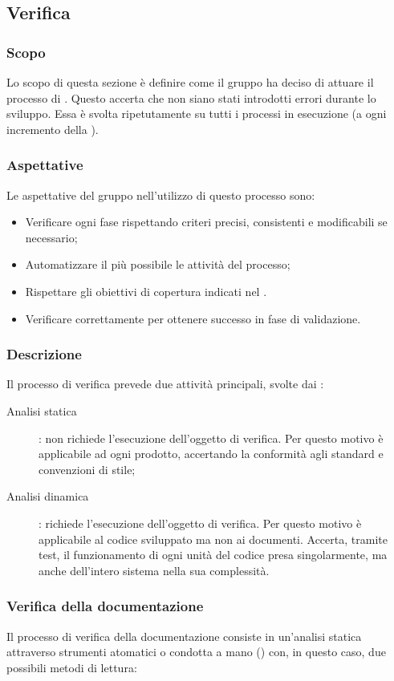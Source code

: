 \subsection{Verifica}
\subsubsection{Scopo}
Lo scopo di questa sezione è definire come il gruppo ha deciso di attuare il processo di . Questo accerta che non siano stati introdotti errori durante lo sviluppo. Essa è svolta ripetutamente su tutti i processi in esecuzione (a ogni incremento della ).

\subsubsection{Aspettative}
Le aspettative del gruppo \Gruppo{} nell'utilizzo di questo processo sono:
\begin{itemize}
	\item Verificare ogni fase rispettando criteri precisi, consistenti e modificabili se necessario;
	\item Automatizzare il più possibile le attività del processo;
	\item Rispettare gli obiettivi di copertura indicati nel \PdQv.
	\item Verificare correttamente per ottenere successo in fase di validazione.
\end{itemize}

\subsubsection{Descrizione}
Il processo di verifica prevede due attività principali, svolte dai  :
\begin{description}
	\item[Analisi statica] : non richiede l'esecuzione dell'oggetto di verifica. Per questo motivo è applicabile ad ogni prodotto, accertando la conformità agli standard e convenzioni di stile;
	\item[Analisi dinamica] : richiede l'esecuzione dell'oggetto di verifica. Per questo motivo è applicabile al codice sviluppato ma non ai documenti. Accerta, tramite test, il funzionamento di ogni unità del codice presa singolarmente, ma anche dell'intero sistema nella sua complessità.
\end{description}

\subsubsection{Verifica della documentazione}
Il processo di verifica della documentazione consiste in un'analisi statica attraverso strumenti atomatici o condotta a mano () con, in questo caso, due possibili metodi di lettura:   

